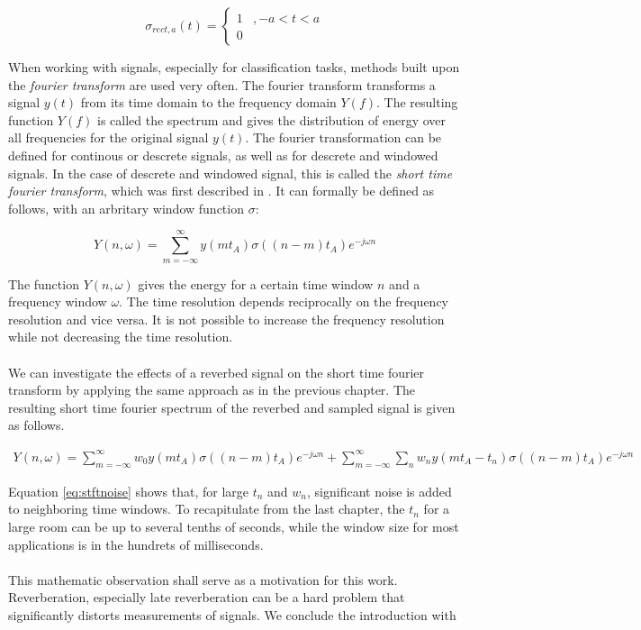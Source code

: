 \[
\sigma_{rect,a}(t) = \begin{cases}
1 &,-a < t < a \\
0
\end{cases}
\]

When working with signals, especially for classification tasks, methods built upon the \textit{fourier transform} are used very often. The fourier transform transforms a signal $y(t)$ from its time domain to the frequency domain $Y(f)$. The resulting function $Y(f)$ is called the spectrum and gives the distribution of energy over all frequencies for the original signal $y(t)$. The fourier transformation can be defined for continous or descrete signals, as well as for descrete and windowed signals. In the case of descrete and windowed signal, this is called the \textit{short time fourier transform}, which was first described in \cite{gabor1946theory}. It can formally be defined as follows, with an arbritary window function $\sigma$:

\[
Y(n, \omega) = \sum_{m = -\infty}^{\infty} y(mt_A) \sigma((n - m)t_A) e^{-j \omega n}  
\]

The function $Y(n, \omega)$ gives the energy for a certain time window $n$ and a frequency window $\omega$. The time resolution depends reciprocally on the frequency resolution and vice versa. It is not possible to increase the frequency resolution while not decreasing the time resolution.\\ \\

We can investigate the effects of a reverbed signal on the short time fourier transform by applying the same approach as in the previous chapter. The resulting short time fourier spectrum of the reverbed and sampled signal is given as follows.

\begin{align*}
Y(n, \omega) = \sum_{m = -\infty}^{\infty} w_0 y(mt_A) \sigma((n - m)t_A) e^{-j \omega n} + 
\sum_{m = -\infty}^{\infty} \sum_{n} w_n y(mt_A - t_n) \sigma((n - m)t_A) e^{-j \omega n}  
\label{eq:stftnoise}
\end{align*}

Equation \ref{eq:stftnoise} shows that, for large $t_n$ and $w_n$, significant noise is added to neighboring time windows. To recapitulate from the last chapter, the $t_n$ for a large room can be up to several tenths of seconds, while the window size for most applications is in the hundrets of milliseconds. 
\\ \\
This mathematic observation shall serve as a motivation for this work. Reverberation, especially late reverberation can be a hard problem that significantly distorts measurements of signals. We conclude the introduction with 

